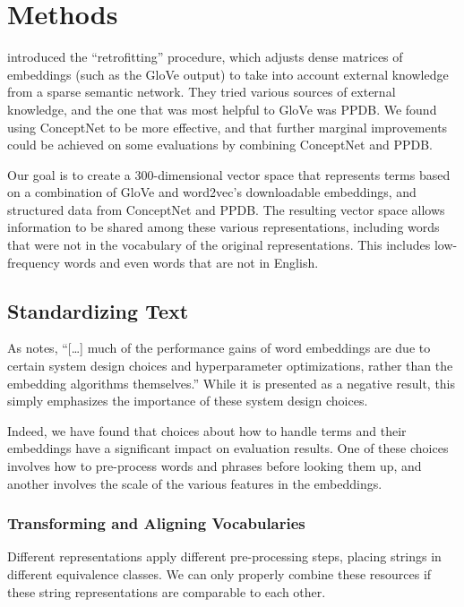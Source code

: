 \documentclass[11pt,letterpaper]{article}
\begin{document}
\section{Methods}

 introduced the ``retrofitting'' procedure,
which adjusts dense matrices of embeddings (such as the GloVe output) to take
into account external knowledge from a sparse semantic network. They tried
various sources of external knowledge, and the one that was most helpful to
GloVe was PPDB.  We found using ConceptNet to be more effective, and that
further marginal improvements could be achieved on some evaluations by
combining ConceptNet and PPDB.

Our goal is to create a 300-dimensional vector space that represents terms based
on a combination of GloVe and word2vec's downloadable embeddings, and structured
data from ConceptNet and PPDB. The resulting vector space allows information to
be shared among these various representations, including words that were not in
the vocabulary of the original representations. This includes low-frequency words
and even words that are not in English.

\subsection{Standardizing Text}

As  notes,
``[\ldots] much of the performance gains of word embeddings are due to certain
system design choices and hyperparameter optimizations, rather than the
embedding algorithms themselves.'' While it is presented as a negative result,
this simply emphasizes the importance of these system design choices.

Indeed, we have found that choices about how to handle terms and their
embeddings have a significant impact on evaluation results. One of these choices
involves how to pre-process words and phrases before looking them up, and
another involves the scale of the various features in the embeddings.


\subsubsection{Transforming and Aligning Vocabularies}

Different representations apply
different pre-processing steps, placing strings in different equivalence
classes. We can only properly combine these resources if these string
representations are comparable to each other.
\end{document}
